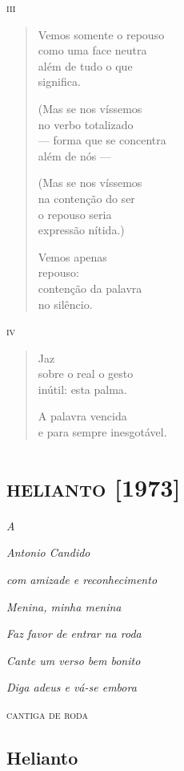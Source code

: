 \medskip
\textsc{iii}

\begin{verse}
Vemos somente o repouso\\
como uma face neutra\\
além de tudo o que\\
significa.

(Mas se nos víssemos\\
no verbo totalizado\\
--- forma que se concentra\\
além de nós ---

(Mas se nos víssemos\\
na contenção do ser\\
o repouso seria\\
expressão nítida.)

Vemos apenas\\
repouso:\\
contenção da palavra\\
no silêncio.
\end{verse}

\medskip
\textsc{iv}

\begin{verse}
Jaz\\
sobre o real o gesto\\
inútil: esta palma.

A palavra vencida\\
e para sempre inesgotável.
\end{verse}

\part{\textsc{helianto} {[}1973{]}}

\mbox{}
\vfill
\thispagestyle{empty}

\hfill\emph{A}

\hfill\emph{Antonio Candido}

\hfill\emph{com amizade e reconhecimento}

\pagebreak
\vfill
\thispagestyle{empty}

\hfill\emph{Menina, minha menina}

\hfill\emph{Faz favor de entrar na roda} 

\hfill\emph{Cante um verso bem bonito}

\hfill\emph{Diga adeus e vá-se embora}

\hfill\textsc{cantiga de roda}

\chapter{Helianto}

